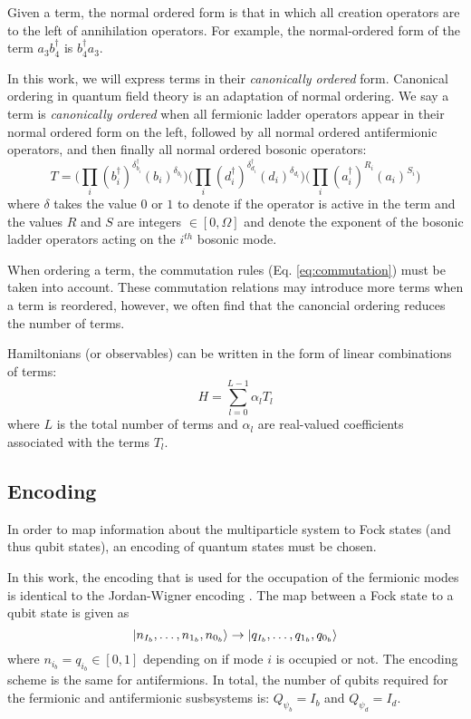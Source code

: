 Given a term, the normal ordered form is that in which all creation operators are to the left of annihilation operators.
For example, the normal-ordered form of the term $a_3 b_4^\dagger$ is $b_4^\dagger a_3$.

In this work, we will express terms in their \emph{canonically ordered} form.
Canonical ordering in quantum field theory is an adaptation of normal ordering.
We say a term is \textit{canonically ordered} when all fermionic ladder operators appear in their normal ordered form on the left, followed by all normal ordered antifermionic operators, and then finally all normal ordered bosonic operators:
\begin{equation}
    T = \Big( \prod_i (b_i^\dagger)^{\delta_{b_i}^{\dagger}} (b_i)^{\delta_{b_i}} \Big) \Big( \prod_i (d_i^\dagger)^{\delta_{d_i}^{\dagger}} (d_i)^{\delta_{d_i}} \Big)   \Big( \prod_i (a_i^\dagger)^{R_i}(a_i)^{S_i} \Big) 
\end{equation}
where $\delta$ takes the value $0$ or $1$ to denote if the operator is active in the term and the values $R$ and $S$ are integers $\in [0, \Omega]$ and denote the exponent of the bosonic ladder operators acting on the $i^{th}$ bosonic mode.

When ordering a term, the commutation rules (Eq. \ref{eq:commutation}) must be taken into account.
These commutation relations may introduce more terms when a term is reordered, however, we often find that the canoncial ordering reduces the number of terms.


Hamiltonians (or observables) can be written in the form of linear combinations of terms:
\begin{equation}
    \label{eq:lclo}
    H = \sum_{l=0}^{L-1} \alpha_l T_l
\end{equation}
where $L$ is the total number of terms and $\alpha_l$ are real-valued coefficients associated with the terms $T_l$.


\subsection{Encoding}
\label{subsec:encoding}
In order to map information about the multiparticle system to Fock states (and thus qubit states), an encoding of quantum states must be chosen.

In this work, the encoding that is used for the occupation of the fermionic modes is identical to the Jordan-Wigner encoding \cite{jordan-wigner}.
The map between a Fock state to a qubit state is given as 
\begin{equation}
    \ket{n_{I_b}, \dots, n_{1_b}, n_{0_b}} \rightarrow \ket{q_{I_b}, \dots, q_{1_b}, q_{0_b}}
\end{equation}
where $n_{i_b} = q_{i_b} \in [0, 1]$ depending on if mode $i$ is occupied or not.
The encoding scheme is the same for antifermions.
In total, the number of qubits required for the fermionic and antifermionic susbsystems is: $Q_{\psi_b} = I_b$ and $Q_{\psi_d} = I_d$.

